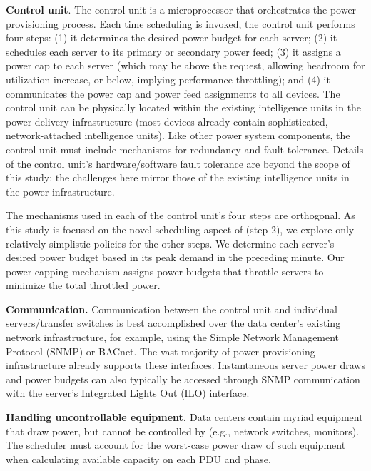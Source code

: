 \textbf{Control unit}. The \PowerRouting control unit is a microprocessor that orchestrates the power provisioning process.  Each time scheduling is invoked, the control unit performs four steps: (1) it determines the desired power budget for each server; (2) it schedules each server to its primary or secondary power feed; (3) it assigns a power cap to each server (which may be above the request, allowing headroom for utilization increase, or below, implying performance throttling); and (4) it communicates the power cap and power feed assignments to all devices.  The control unit can be physically located within the existing intelligence units in the power delivery infrastructure (most devices already contain sophisticated, network-attached intelligence units). Like other power system components, the control unit must include mechanisms for redundancy and fault tolerance.  Details of the control unit's hardware/software fault tolerance are beyond the scope of this study; the challenges here mirror those of the existing intelligence units in the power infrastructure.  

The mechanisms used in each of the control unit's four steps are orthogonal. As this study is focused on the novel scheduling aspect of \PowerRouting (step 2), we explore only relatively simplistic policies for the other steps.  We determine each server's desired power budget based in its peak demand in the preceding minute.  Our power capping mechanism assigns power budgets that throttle servers to minimize the total throttled power.

\textbf{Communication.} Communication between the control unit and individual servers/transfer switches is best accomplished over the data center's existing network infrastructure, for example, using the Simple Network Management Protocol (SNMP) or BACnet.  The vast majority of power provisioning infrastructure already supports these interfaces.  Instantaneous server power draws and power budgets can also typically be accessed through SNMP communication with the server's Integrated Lights Out (ILO) interface. 

\textbf{Handling uncontrollable equipment.} Data centers contain myriad equipment that draw power, but cannot be controlled by \PowerRouting (e.g., network switches, monitors).  The scheduler must account for the worst-case power draw of such equipment when calculating available capacity on each PDU and phase.

